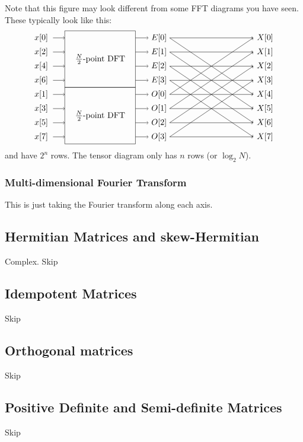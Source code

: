 Note that this figure may look different from some FFT diagrams you have seen.
These typically look like this:
\[
\begin{tikzpicture}
  \draw (0, -2.1) rectangle (3, .3) node[midway] {$\frac{N}{2}$-point DFT};
  \draw (0, -4.5) rectangle (3, -2.1) node[midway] {$\frac{N}{2}$-point DFT};

  \foreach \i in {0,2,4,6} {
    \node at (-1, - \i*0.3) {$x[\i]$};
    \draw[->] (-0.5, - \i*0.3) -- (0, - \i*0.3);
  }
  \foreach \i in {1,3,5,7} {
    \node at (-1, - \i*0.3 - 2.1) {$x[\i]$};
    \draw[->] (-0.5, - \i*0.3 - 2.1) -- (0, - \i*0.3 - 2.1);
  }
  \foreach \i in {0,1,2,3} {
    \node (E) at (4, - \i*0.6) {$E[\i]$};
    \draw[->] (3, - \i*0.6) -- (E.west);
    \draw[->] (E.east) -- (8, - \i*0.6);
    \draw[->] (E.east) -- (8, - \i*0.6 - 2.4);
  }
  \foreach \i in {0,1,2,3} {
    \node (O) at (4, - \i*0.6 - 2.4) {$O[\i]$};
    \draw[->] (3, - \i*0.6 - 2.4) -- (O.west);
    \draw[->] (O.east) -- (8, - \i*0.6);
    \draw[->] (O.east) -- (8, - \i*0.6 - 2.4);
  }
  \foreach \i in {0,...,7} {
    \node at (8.5, - \i*0.6) {$X[\i]$};
  }
\end{tikzpicture}
\]
and have $2^n$ rows.
The tensor diagram only has $n$ rows (or $\log_2 N$).

\subsubsection{Multi-dimensional Fourier Transform}
This is just taking the Fourier transform along each axis.

\newpage


\subsection{Hermitian Matrices and skew-Hermitian}
Complex. Skip
\subsection{Idempotent Matrices}
Skip
\subsection{Orthogonal matrices}
Skip
\subsection{Positive Definite and Semi-definite Matrices}
Skip
